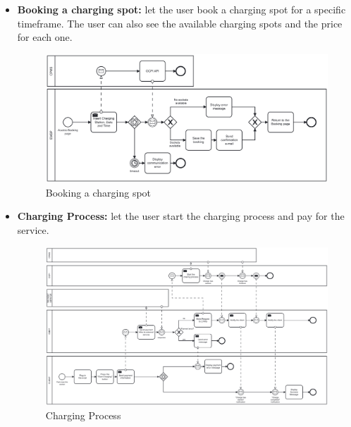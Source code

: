 \documentclass[table, 12pt]{article} %
\begin{document}
        \newpage
        \begin{itemize}                                 
            \item \textbf{Booking a charging spot:} let the user book a charging spot for a specific timeframe. The user can also see the available charging spots and the price for each one.
            
            \begin{center}
                \begin{figure}[!h]
                    \includegraphics[width=\textwidth]{assets/bpmn/Booking.png}
                    \caption{Booking a charging spot}
                    \label{fig: Booking a charging spot}
                \end{figure}
            \end{center}
        \end{itemize}

        \newpage
        \begin{itemize}                                 
            \item \textbf{Charging Process:} let the user start the charging process and pay for the service.
        
            \begin{center}
                \begin{figure}[!h]
                    \includegraphics[width=\textwidth]{assets/bpmn/Charging Process.png}
                    \caption{Charging Process}
                    \label{fig: Charging Process}
                \end{figure}
            \end{center}
        \end{itemize}
    
\end{document}
